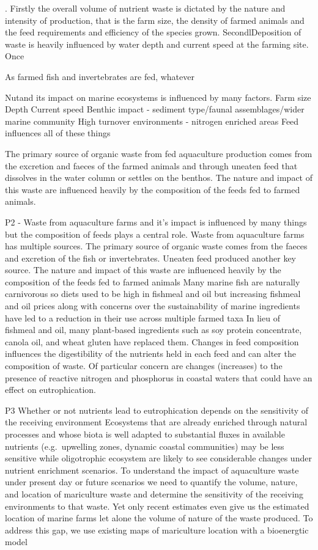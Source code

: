 \documentclass[
  a4paper,
]{article}
\begin{document}
. Firstly the overall volume of nutrient waste is dictated by the nature
and intensity of production, that is the farm size, the density of
farmed animals and the feed requirements and efficiency of the species
grown. SecondlDeposition of waste is heavily influenced by water depth
and current speed at the farming site. Once

As farmed fish and invertebrates are fed, whatever

Nutand its impact on marine ecosystems is influenced by many factors.
Farm size Depth Current speed Benthic impact - sediment type/faunal
assemblages/wider marine community High turnover environments - nitrogen
enriched areas Feed influences all of these things

The primary source of organic waste from fed aquaculture production
comes from the excretion and faeces of the farmed animals and through
uneaten feed that dissolves in the water column or settles on the
benthos. The nature and impact of this waste are influenced heavily by
the composition of the feeds fed to farmed animals.

P2 - Waste from aquaculture farms and it's impact is influenced by many
things but the composition of feeds plays a central role. Waste from
aquaculture farms has multiple sources. The primary source of organic
waste comes from the faeces and excretion of the fish or invertebrates.
Uneaten feed produced another key source. The nature and impact of this
waste are influenced heavily by the composition of the feeds fed to
farmed animals Many marine fish are naturally carnivorous so diets used
to be high in fishmeal and oil but increasing fishmeal and oil prices
along with concerns over the sustainability of marine ingredients have
led to a reduction in their use across multiple farmed taxa In lieu of
fishmeal and oil, many plant-based ingredients such as soy protein
concentrate, canola oil, and wheat gluten have replaced them. Changes in
feed composition influences the digestibility of the nutrients held in
each feed and can alter the composition of waste. Of particular concern
are changes (increases) to the presence of reactive nitrogen and
phosphorus in coastal waters that could have an effect on
eutrophication.

P3 Whether or not nutrients lead to eutrophication depends on the
sensitivity of the receiving environment Ecosystems that are already
enriched through natural processes and whose biota is well adapted to
substantial fluxes in available nutrients (e.g.~upwelling zones, dynamic
coastal communities) may be less sensitive while oligotrophic ecosystem
are likely to see considerable changes under nutrient enrichment
scenarios. To understand the impact of aquaculture waste under present
day or future scenarios we need to quantify the volume, nature, and
location of mariculture waste and determine the sensitivity of the
receiving environments to that waste. Yet only recent estimates even
give us the estimated location of marine farms let alone the volume of
nature of the waste produced. To address this gap, we use existing maps
of mariculture location with a bioenergtic model
\end{document}
